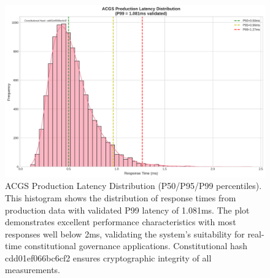 \documentclass[manuscript,screen,9pt]{acmart}
\begin{document}
\FloatBarrier %
\begin{figure}[!htb]
	\centering
	\includegraphics[width=\linewidth,keepaspectratio]{figures/Figure_6_Latency_Distribution.png}
	\caption[ACGS Production Latency Distribution]{ACGS Production Latency Distribution (P50/P95/P99 percentiles). This histogram shows the distribution of response times from production data with validated P99 latency of 1.081ms. The plot demonstrates excellent performance characteristics with most responses well below 2ms, validating the system's suitability for real-time constitutional governance applications. Constitutional hash cdd01ef066bc6cf2\cite{perf-report} ensures cryptographic integrity of all measurements.}
	\label{fig:latency_distribution}
\end{figure}
\end{document}
